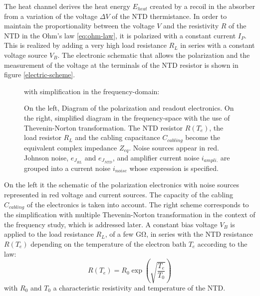 The heat channel derives the heat energy $E_{heat}$ created by a recoil in the absorber from a variation of the voltage $\Delta V$ of the NTD thermistance. In order to maintain the proportionality between the voltage $V$ and the resistivity $R$ of the NTD in the Ohm's law \ref{eq:ohm-law}, it is polarized with a constant current $I_P$. This is realized by adding a very high load resistance $R_L$ in series with a constant voltage source $V_B$.
The electronic schematic that allows the polarization and the measurement of the voltage at the terminals of the NTD resistor is shown in figure \ref{electric-scheme}.

\begin{figure}
\begin{minipage}[c]{0.45\textwidth}
\resizebox{!}{\textwidth}{%
\begin{circuitikz}[scale=1]
	
\end{circuitikz}
}%
\end{minipage}
\hfill
\vrule{}
\hfill
\begin{minipage}[c]{0.45\textwidth}
\begin{center}
with simplification in the frequency-domain:
\end{center}
\resizebox{\textwidth}{!}{%
\begin{circuitikz}
	
\end{circuitikz}
}%
\end{minipage}
\caption{On the left, Diagram of the polarization and readout electronics. On the right, simplified diagram in the frequency-space with the use of Thevenin-Norton transformation. The NTD resistor $R(T_e)$, the load resistor $R_L$ and the cabling capacitance $C_{cabling}$ become the equivalent complex impedance $Z_{eq}$. Noise sources appear in red. Johnson noise, $e_{J_{RL}}$ and $e_{J_{NTD}}$, and amplifier current noise $i_{ampli.}$ are grouped into a current noise $i_{noise}$ whose expression is specified.}
\label{fig:ethem-electric-scheme}
\end{figure}

On the left it the schematic of the polarization electronics with noise sources represented in red voltage and current sources. The capacity of the cabling $C_{cabling}$ of the electronics is taken into account. The right scheme corresponds to the simplification with multiple Thevenin-Norton transformation \cite{Mather:1982} in the context of the frequency study, which is addressed later.
A constant bias voltage $V_B$ is applied to the load resistance $R_L$, of a few \si{\giga\ohm}, in series with the NTD resistance $R(T_e)$ depending on the temperature of the electron bath $T_e$ according to the law:
\begin{equation}
R (T_e) = R_0 \exp \left( \sqrt{ \frac{T_e}{T_0} } \right)
\end{equation}
with $R_0$ and $T_0$ a characteristic resistivity and temperature of the NTD.

